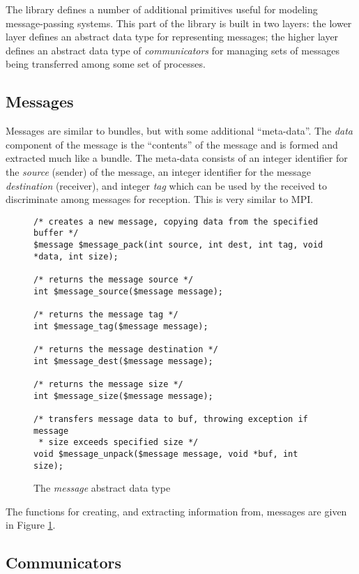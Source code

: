 The library defines a number of additional primitives useful for
modeling message-passing systems.  This part of the library is built
in two layers: the lower layer defines an abstract data type for
representing messages; the higher layer defines an abstract data type
of \emph{communicators} for managing sets of messages being
transferred among some set of processes.

\subsection{Messages}

Messages are similar to bundles, but with some additional
``meta-data''.  The \emph{data} component of the message is the
``contents'' of the message and is formed and extracted much like a
bundle.  The meta-data consists of an integer identifier for the
\emph{source} (sender) of the message, an integer identifier for the
message \emph{destination} (receiver), and integer \emph{tag} which
can be used by the received to discriminate among messages for
reception.  This is very similar to MPI.

\begin{figure}
  \begin{small}
\begin{verbatim}
/* creates a new message, copying data from the specified buffer */ 
$message $message_pack(int source, int dest, int tag, void *data, int size);

/* returns the message source */ 
int $message_source($message message);

/* returns the message tag */
int $message_tag($message message);

/* returns the message destination */ 
int $message_dest($message message);

/* returns the message size */ 
int $message_size($message message);

/* transfers message data to buf, throwing exception if message
 * size exceeds specified size */ 
void $message_unpack($message message, void *buf, int size);
\end{verbatim}
  \end{small}
  \caption{The \emph{message} abstract data type}
  \label{fig:message}
\end{figure}

The functions for creating, and extracting information from, messages
are given in Figure \ref{fig:message}.

\subsection{Communicators}

